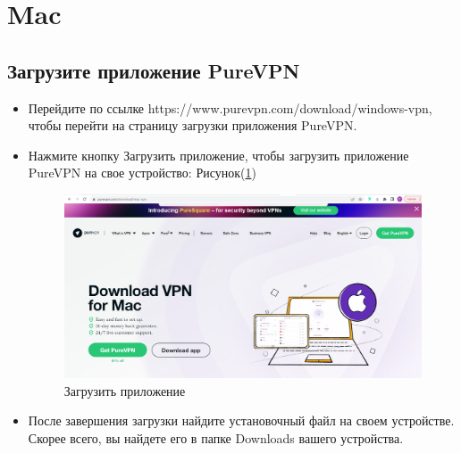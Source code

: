 \section{Mac}

\subsection{Загрузите приложение PureVPN} 
\begin{itemize}
\item Перейдите по ссылке https://www.purevpn.com/download/windows-vpn, чтобы перейти на страницу загрузки приложения PureVPN.
\item Нажмите кнопку Загрузить приложение, чтобы загрузить приложение PureVPN на свое устройство:  Рисунок(\ref{fig:25})
\begin{figure}[H]
\includegraphics[width=14cm]{20.png}
\centering
\caption{Загрузить приложение}
\label{fig:25}
\end{figure}
\item После завершения загрузки найдите установочный файл на своем устройстве. Скорее всего, вы найдете его в папке Downloads вашего устройства.
\end{itemize}

